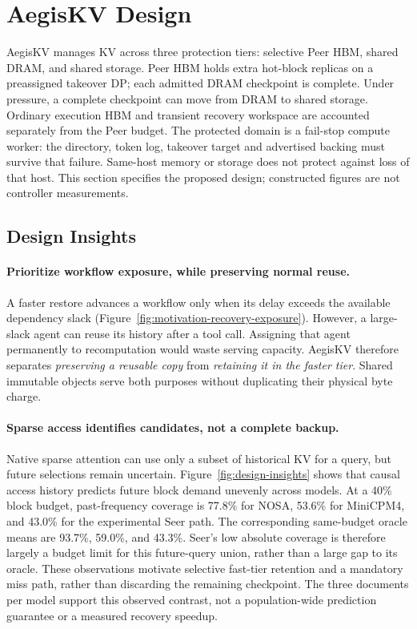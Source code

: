 \section{AegisKV Design}
\label{sec:design}

AegisKV manages KV across three protection tiers: selective Peer HBM,
shared DRAM, and shared storage. Peer HBM holds extra hot-block replicas
on a preassigned takeover DP; each admitted DRAM checkpoint is complete.
Under pressure, a complete checkpoint can move from DRAM to shared
storage. Ordinary execution HBM and transient recovery workspace are
accounted separately from the Peer budget. The protected domain is a
fail-stop compute worker: the directory, token log, takeover target and
advertised backing must survive that failure. Same-host memory or storage
does not protect against loss of that host. This section specifies the
proposed design; constructed figures are not controller measurements.

\subsection{Design Insights}
\label{sec:design-insights}

\paragraph{Prioritize workflow exposure, while preserving normal reuse.}
A faster restore advances a workflow only when its delay exceeds the
available dependency slack (Figure~\ref{fig:motivation-recovery-exposure}).
However, a large-slack agent can reuse its history after a tool call.
Assigning that agent permanently to recomputation would waste serving
capacity. AegisKV therefore separates \emph{preserving a reusable copy}
from \emph{retaining it in the faster tier}. Shared immutable objects
serve both purposes without duplicating their physical byte charge.

\paragraph{Sparse access identifies candidates, not a complete backup.}
Native sparse attention can use only a subset of historical KV for a
query, but future selections remain uncertain. Figure~\ref{fig:design-insights}
shows that causal access history predicts future block demand unevenly
across models. At a 40\% block budget, past-frequency coverage is 77.8\%
for NOSA, 53.6\% for MiniCPM4, and 43.0\% for the experimental Seer path.
The corresponding same-budget oracle means are 93.7\%, 59.0\%, and
43.3\%. Seer's low absolute coverage is therefore largely a budget limit
for this future-query union, rather than a large gap to its oracle.
These observations motivate selective fast-tier retention and a mandatory
miss path, rather than discarding the remaining checkpoint. The three
documents per model support this observed contrast, not a population-wide
prediction guarantee or a measured recovery speedup.

